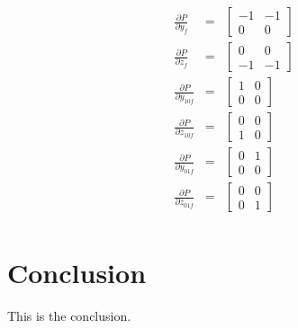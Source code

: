 \documentclass{article}
\begin{document}
\begin{eqnarray*}
                            \frac{\partial{P}}{\partial{y_{f}}}   & = &    
                                    \left[\begin{matrix}
                                      -1 & -1\\ 0 & 0  
                                    \end{matrix} \right] \\
  			    \frac{\partial{P}}{\partial{z_{f}}}   & = &
                                    \left[\begin{matrix}
                                      0 & 0\\ -1 & -1  
                                    \end{matrix} \right] \\
 			    \frac{\partial{P}}{\partial{y_{10f}}} & = &
                                    \left[\begin{matrix}
                                      1 & 0\\ 0 & 0  
                                    \end{matrix} \right] \\
 	                    \frac{\partial{P}}{\partial{z_{10f}}} & = &
                                    \left[\begin{matrix}
                                      0 & 0\\ 1 & 0  
                                    \end{matrix} \right] \\
 			    \frac{\partial{P}}{\partial{y_{01f}}} & = &
                                    \left[\begin{matrix}
                                      0 & 1\\ 0 & 0  
                                    \end{matrix} \right] \\
 			    \frac{\partial{P}}{\partial{z_{01f}}} & = &
                                    \left[\begin{matrix}
                                      0 & 0\\ 0 & 1  
                                    \end{matrix} \right] \\ 
\end{eqnarray*}








\section{Conclusion}
This is the conclusion.
\end{document}
